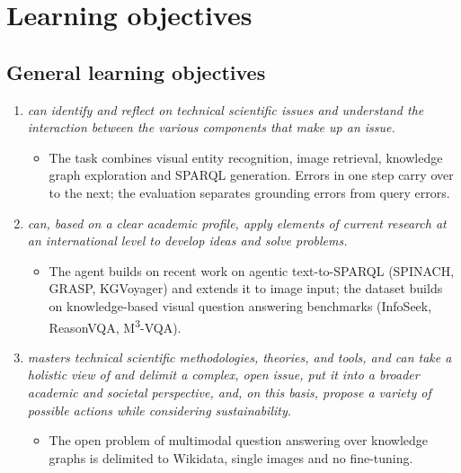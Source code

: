\documentclass[a4paper,11pt]{article}
\newif\ifshowsupervisorq
\newcommand{\supervisorq}[1]{%
  \ifshowsupervisorq
  \begin{supervisorqbox}#1
  \end{supervisorqbox}%
  \fi
}
\begin{document}
\supervisorq{Are the number and scope of these research questions
  appropriate? Is it fine to present the dataset as a contribution instead
of a research question?}

\section{Learning objectives}

\subsection{General learning objectives}

\begin{enumerate}
  \item \emph{can identify and reflect on technical scientific issues and
      understand the interaction between the various components that make up
    an issue.}
    \begin{itemize}
      \item The task combines visual entity recognition, image retrieval,
        knowledge graph exploration and SPARQL generation. Errors in one step
        carry over to the next; the evaluation separates grounding errors
        from query errors.
    \end{itemize}
  \item \emph{can, based on a clear academic profile, apply elements of
      current research at an international level to develop ideas and solve
    problems.}
    \begin{itemize}
      \item The agent builds on recent work on agentic text-to-SPARQL
        (SPINACH, GRASP, KGVoyager) and extends it to image input; the
        dataset builds on knowledge-based visual question answering
        benchmarks (InfoSeek, ReasonVQA,
        M\textsuperscript{3}-VQA).
    \end{itemize}
  \item \emph{masters technical scientific methodologies, theories, and
      tools, and can take a holistic view of and delimit a complex, open
      issue, put it into a broader academic and societal perspective, and, on
      this basis, propose a variety of possible actions while considering
    sustainability.}
    \begin{itemize}
      \item The open problem of multimodal question answering over knowledge
        graphs is delimited to Wikidata, single images and no fine-tuning.

\end{itemize}
\end{enumerate}
\end{document}
